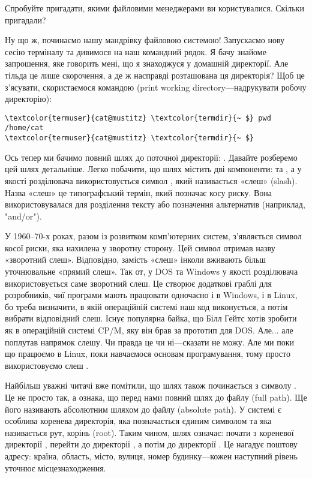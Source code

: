\begin{exercise}
Спробуйте пригадати, якими файловими менеджерами ви користувалися.
Скільки пригадали?
\end{exercise}

Ну що ж, починаємо нашу мандрівку файловою системою!
Запускаємо нову сесію терміналу та дивимося на наш командний рядок.
Я бачу знайоме запрошення, яке говорить мені, що я знаходжуся у домашній директорії.
Але тільда це лише скорочення, а де ж насправді розташована ця директорія?
Щоб це з'ясувати, скористаємося командою  (print working directory---надрукувати робочу директорію):

\begin{Verbatim}[fontsize=\footnotesize,commandchars=\\\{\},xleftmargin=\parindent]
\textcolor{termuser}{cat@mustitz} \textcolor{termdir}{~ $} pwd
/home/cat
\textcolor{termuser}{cat@mustitz} \textcolor{termdir}{~ $}
\end{Verbatim}

Ось тепер ми бачимо повний шлях до поточної директорії: .
Давайте розберемо цей шлях детальніше.
Легко побачити, що шлях містить дві компоненти:  та ,
а у якості розділювача використовується символ \chr{/}, який називається «слеш» (slash).
Назва «слеш» це типографський термін, який позначає косу риску.
Вона використовувалася для розділення тексту або позначення альтернатив (наприклад, "and/or").

У 1960--70-х роках, разом із розвитком комп'ютерних систем,
з'являється символ косої риски, яка нахилена у зворотну сторону.
Цей символ \chr{\textbackslash} отримав назву «зворотний слеш».
Відповідно, замість «слеш» інколи вживають більш уточнювальне «прямий слеш».
Так от, у DOS та Windows у якості розділювача використовується саме зворотний слеш.
Це створює додаткові граблі для розробників,
чиї програми мають працювати одночасно і в Windows, і в Linux,
бо треба визначити, в якій операційній системі наш код виконується,
а потім вибрати відповідний слеш.
Існує популярна байка, що Білл Гейтс хотів зробити як в операційній системі CP/M,
яку він брав за прототип для DOS.
Але... але поплутав напрямок слешу.
Чи правда це чи ні---сказати не можу.
Але ми поки що працюємо в Linux, поки навчаємося основам програмування, тому просто використовуємо слеш \file{/}.

Найбільш уважні читачі вже помітили, що шлях також починається з символу \chr{/}.
Це не просто так, а ознака, що перед нами повний шлях до файлу (full path).
Ще його називають абсолютним шляхом до файлу (absolute path).
У системі є особлива коренева директорія, яка позначається єдиним символом \chr{/} та яка називається рут, корінь (root).
Таким чином, шлях  означає: почати з кореневої директорії \file{/}, перейти до директорії , а потім до директорії .
Це нагадує поштову адресу: країна, область, місто, вулиця, номер будинку---кожен наступний рівень уточнює місцезнаходження.

